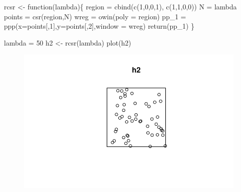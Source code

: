 \documentclass[
  letterpaper,
  DIV=11,
  numbers=noendperiod]{scrartcl}
\newenvironment{Shaded}{\begin{snugshade}}{\end{snugshade}}
\newcommand{\AttributeTok}[1]{\textcolor[rgb]{0.40,0.45,0.13}{#1}}
\newcommand{\ControlFlowTok}[1]{\textcolor[rgb]{0.00,0.23,0.31}{#1}}
\newcommand{\DecValTok}[1]{\textcolor[rgb]{0.68,0.00,0.00}{#1}}
\newcommand{\FunctionTok}[1]{\textcolor[rgb]{0.28,0.35,0.67}{#1}}
\newcommand{\NormalTok}[1]{\textcolor[rgb]{0.00,0.23,0.31}{#1}}
\newcommand{\OtherTok}[1]{\textcolor[rgb]{0.00,0.23,0.31}{#1}}
\begin{document}
\begin{Shaded}
\begin{Highlighting}[]
\NormalTok{rcsr }\OtherTok{\textless{}{-}} \ControlFlowTok{function}\NormalTok{(lambda)\{}
\NormalTok{  region }\OtherTok{=} \FunctionTok{cbind}\NormalTok{(}\FunctionTok{c}\NormalTok{(}\DecValTok{1}\NormalTok{,}\DecValTok{0}\NormalTok{,}\DecValTok{0}\NormalTok{,}\DecValTok{1}\NormalTok{), }\FunctionTok{c}\NormalTok{(}\DecValTok{1}\NormalTok{,}\DecValTok{1}\NormalTok{,}\DecValTok{0}\NormalTok{,}\DecValTok{0}\NormalTok{))}
\NormalTok{  N }\OtherTok{=}\NormalTok{ lambda}
\NormalTok{  points }\OtherTok{=} \FunctionTok{csr}\NormalTok{(region,N)}
\NormalTok{  wreg }\OtherTok{=} \FunctionTok{owin}\NormalTok{(}\AttributeTok{poly =}\NormalTok{ region)}
\NormalTok{  pp\_1 }\OtherTok{=} \FunctionTok{ppp}\NormalTok{(}\AttributeTok{x=}\NormalTok{points[,}\DecValTok{1}\NormalTok{],}\AttributeTok{y=}\NormalTok{points[,}\DecValTok{2}\NormalTok{],}\AttributeTok{window =}\NormalTok{ wreg)}
  \FunctionTok{return}\NormalTok{(pp\_1)}
\NormalTok{\}}
\end{Highlighting}
\end{Shaded}

\begin{Shaded}
\begin{Highlighting}[]
\NormalTok{lambda }\OtherTok{=} \DecValTok{50}
\NormalTok{h2 }\OtherTok{\textless{}{-}} \FunctionTok{rcsr}\NormalTok{(lambda)}
\FunctionTok{plot}\NormalTok{(h2)}
\end{Highlighting}
\end{Shaded}

\begin{figure}[H]

{\centering \includegraphics{robby_homework_1_files/figure-pdf/unnamed-chunk-8-1.pdf}

}

\end{figure}
\end{document}
